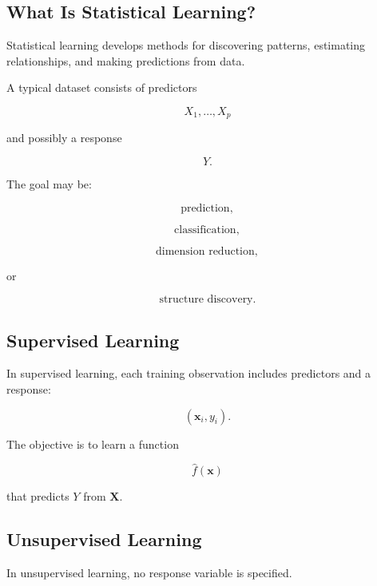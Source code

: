 \subsection{What Is Statistical Learning?}
\label{subsec:what-is-statistical-learning}

Statistical learning develops methods for discovering patterns,
estimating relationships, and making predictions from data.

A typical dataset consists of predictors

\[
\boxed{
X_1,\ldots,X_p
}
\]

and possibly a response

\[
\boxed{
Y.
}
\]

The goal may be:

\[
\boxed{
\text{prediction},
}
\]

\[
\boxed{
\text{classification},
}
\]

\[
\boxed{
\text{dimension reduction},
}
\]

or

\[
\boxed{
\text{structure discovery}.
}
\]

\subsection{Supervised Learning}
\label{subsec:supervised-learning}

In supervised learning, each training observation includes predictors and
a response:

\[
\boxed{
(\mathbf{x}_i,y_i).
}
\]

The objective is to learn a function

\[
\boxed{
\widehat{f}(\mathbf{x})
}
\]

that predicts \(Y\) from \(\mathbf{X}\).

\subsection{Unsupervised Learning}
\label{subsec:unsupervised-learning}

In unsupervised learning, no response variable is specified.

